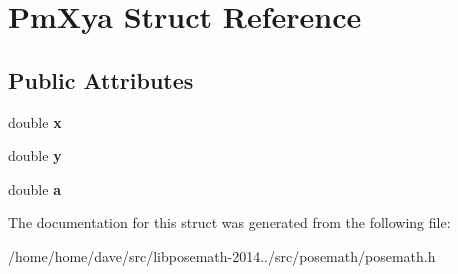 \hypertarget{structPmXya}{}\section{Pm\+Xya Struct Reference}
\label{structPmXya}
\subsection*{Public Attributes}
\begin{DoxyCompactItemize}
\item 
\hypertarget{structPmXya_aa736345bf65d14e763ac4e7b225c59cc}{}double {\bfseries x}\label{structPmXya_aa736345bf65d14e763ac4e7b225c59cc}

\item 
\hypertarget{structPmXya_af9611e4556bc5a1d04192cff3ddb7203}{}double {\bfseries y}\label{structPmXya_af9611e4556bc5a1d04192cff3ddb7203}

\item 
\hypertarget{structPmXya_aa39eb0bed993ac3be680a64c04d58200}{}double {\bfseries a}\label{structPmXya_aa39eb0bed993ac3be680a64c04d58200}

\end{DoxyCompactItemize}


The documentation for this struct was generated from the following file\+:\begin{DoxyCompactItemize}
\item 
/home/home/dave/src/libposemath-\/2014../src/posemath/posemath.\+h\end{DoxyCompactItemize}
